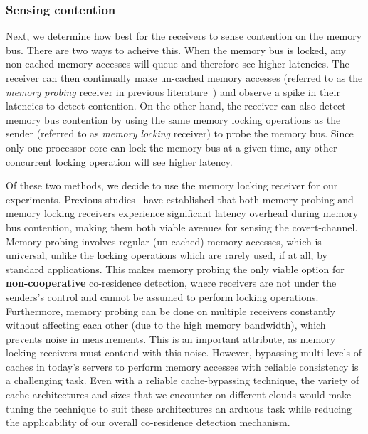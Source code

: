 \subsubsection{Sensing contention} 
Next, we determine how best for the receivers to sense contention on the memory
bus. There are two ways to acheive this. When the memory bus is locked, any
non-cached memory accesses will queue and therefore see higher latencies.  The
receiver can then continually make un-cached memory accesses (referred to as the
\textit{memory probing} receiver in previous literature~\cite{varadarajan2015})
and observe a spike in their latencies to detect contention. On the other hand,
the receiver can also detect memory bus contention by using the same memory
locking operations as the sender (referred to as \textit{memory locking}
receiver) to probe the memory bus. Since only one processor core can lock the
memory bus at a given time, any other concurrent locking operation will see
higher latency. 

Of these two methods, we decide to use the memory locking receiver for our
experiments.  Previous studies~\cite{wuusenix2012,varadarajan2015} have
established that both memory probing and memory locking receivers experience
significant latency overhead during memory bus contention, making them both
viable avenues for sensing the covert-channel. Memory probing involves regular
(un-cached) memory accesses, which is universal, unlike the locking operations
which are rarely used, if at all, by standard applications. This makes memory
probing the only viable option for \textbf{non-cooperative} co-residence
detection, where receivers are not under the senders's control and cannot be
assumed to perform locking operations.  Furthermore, memory probing can be done
on multiple receivers constantly without affecting each other (due to the high
memory bandwidth), which prevents noise in measurements. This is an important
attribute, as memory locking receivers must contend with this noise. However,
bypassing multi-levels of caches in today's servers to perform memory accesses
with reliable consistency is a challenging task. Even with a reliable
cache-bypassing technique, the variety of cache architectures and sizes that we
encounter on different clouds would make tuning the technique to suit these
architectures an arduous task while reducing the applicability of our overall
co-residence detection mechanism. 


